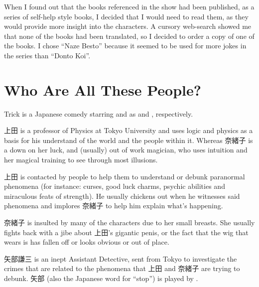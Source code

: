 \par When I found out that the books referenced in the show had been published, as a series of self-help style books, I decided that I would need to read them, as they would provide more insight into the characters. A cursory web-search showed me that none of the books had been translated, so I decided to order a copy of one of the books. I chose ``Naze Besto'' because it seemed to be used for more jokes in the series than ``Donto Koi''.


\section*{Who Are All These People?}

Trick is a Japanese comedy starring  and  as  and , respectively.

\par 上田 is a professor of Physics at Tokyo University and uses logic and physics as a basis for his understand of the world and the people within it. Whereas 奈緒子 is a down on her luck, and (usually) out of work magician, who uses intuition and her magical training to see through most illusions.

\par 上田 is contacted by people to help them to understand or debunk paranormal phenomena (for instance: curses, good luck charms, psychic abilities and miraculous feats of strength). He usually chickens out when he witnesses said phenomena and implores 奈緒子 to help him explain what's happening.

\par 奈緒子 is insulted by many of the characters due to her small breasts. She usually fights back with a jibe about 上田's gigantic penis, or the fact that the wig that  wears is has fallen off or looks obvious or out of place.

\par 矢部謙三 is an inept Assistant Detective, sent from Tokyo to investigate the crimes that are related to the phenomena that 上田 and 奈緒子 are trying to debunk. 矢部 (also the Japanese word for ``stop'') is played by .

